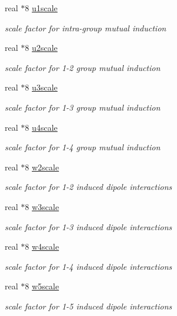 \begin{DoxyCompactItemize}
real $\ast$8 \hyperlink{classpolpot_a6ad8c7d8432e1c8dacacec8be9664184}{u1scale}
\begin{DoxyCompactList}\small\item\em scale factor for intra-\/group mutual induction \end{DoxyCompactList}\item 
real $\ast$8 \hyperlink{classpolpot_a85b778aeb8f3d8700297b7eab1118f47}{u2scale}
\begin{DoxyCompactList}\small\item\em scale factor for 1-\/2 group mutual induction \end{DoxyCompactList}\item 
real $\ast$8 \hyperlink{classpolpot_a86ef52add4f615bf1a016c23ffd89cee}{u3scale}
\begin{DoxyCompactList}\small\item\em scale factor for 1-\/3 group mutual induction \end{DoxyCompactList}\item 
real $\ast$8 \hyperlink{classpolpot_ac0bfb27f34b9fb631293409ff61214d2}{u4scale}
\begin{DoxyCompactList}\small\item\em scale factor for 1-\/4 group mutual induction \end{DoxyCompactList}\item 
real $\ast$8 \hyperlink{classpolpot_a35266232ef5bad9fdab31aede7f54a3a}{w2scale}
\begin{DoxyCompactList}\small\item\em scale factor for 1-\/2 induced dipole interactions \end{DoxyCompactList}\item 
real $\ast$8 \hyperlink{classpolpot_ad0a29e94706d0210a94ac7897716f987}{w3scale}
\begin{DoxyCompactList}\small\item\em scale factor for 1-\/3 induced dipole interactions \end{DoxyCompactList}\item 
real $\ast$8 \hyperlink{classpolpot_a80642be89424de1fa5eaf796a215c251}{w4scale}
\begin{DoxyCompactList}\small\item\em scale factor for 1-\/4 induced dipole interactions \end{DoxyCompactList}\item 
real $\ast$8 \hyperlink{classpolpot_ad036ebb7c31962e9aae5014aac94e41c}{w5scale}
\begin{DoxyCompactList}\small\item\em scale factor for 1-\/5 induced dipole interactions \end{DoxyCompactList}\item 

\end{DoxyCompactItemize}
